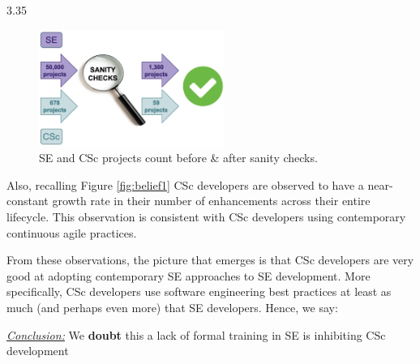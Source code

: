 \documentclass[conference,10pt]{IEEEtran}
\newenvironment{RQ}{\vspace{1mm}\begin{tcolorbox}[enhanced,width=3.4in,size=fbox,colback=red!5!white,drop shadow southeast,sharp corners]}{\end{tcolorbox}}
\begin{document}
\centerline{  3.35 }

\begin{figure}
  \centering
  \includegraphics[width=0.8\linewidth, height=1.5in]{img/sanity.png} 
  \caption{SE and CSc projects count before \& after sanity checks.}
  \label{fig:sanity}
  \vspace{-10pt}
\end{figure}
 Also, recalling Figure \ref{fig:belief1} CSc developers are observed to have a near-constant growth rate in their number of enhancements across their entire lifecycle. This observation is consistent with CSc developers using
  contemporary continuous agile practices. 

From these observations, the picture that emerges is that CSc developers are very good at adopting contemporary  SE approaches to SE development. More specifically, CSc developers
use software engineering best practices   at least as much (and perhaps even more) that SE developers. Hence, we say: 
\begin{RQ}
\textit{\underline{Conclusion:}} We \textbf{doubt} this a lack of formal training in SE is inhibiting CSc development
\end{RQ}


\end{document}
